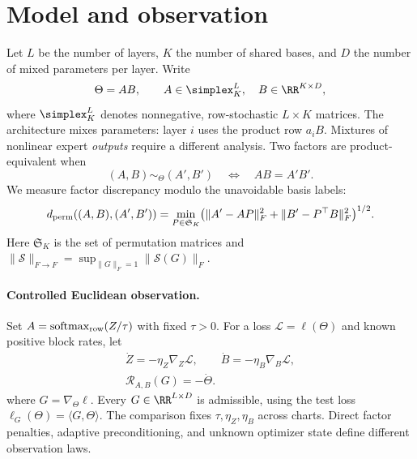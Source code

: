 \section{Model and observation}
\label{sec:problem}

Let $L$ be the number of layers, $K$ the number of shared bases, and $D$
the number of mixed parameters per layer. Write
\begin{equation}
 \Theta=AB,\qquad A\in\simplex_K^L,\quad B\in\RR^{K\times D},
 \label{eq:factorization}
\end{equation}
where $\simplex_K^L$ denotes nonnegative, row-stochastic $L\times K$
matrices. The architecture mixes parameters: layer $i$ uses the product row $a_iB$.
Mixtures of nonlinear expert \emph{outputs} require a different analysis. Two factors are product-equivalent when
\begin{equation}
 (A,B)\sim_\Theta(A',B')\quad\Longleftrightarrow\quad AB=A'B'.
 \label{eq:effective_equivalence}
\end{equation}
We measure factor discrepancy modulo the unavoidable basis labels:
\begin{equation}
 d_{\rm perm}((A,B),(A',B'))=
 \min_{P\in\mathfrak S_K}
 \bigl(\|A'-AP\|_F^2+\|B'-P^\top B\|_F^2\bigr)^{1/2}.
 \label{eq:permutation-distance}
\end{equation}
Here $\mathfrak S_K$ is the set of permutation matrices and
$\|\mathcal S\|_{F\to F}=\sup_{\|G\|_F=1}\|\mathcal S(G)\|_F$.

\paragraph{Controlled Euclidean observation.}
Set $A=\operatorname{softmax}_{\rm row}(Z/\tau)$ with fixed $\tau>0$.
For a loss $\mathcal L=\ell(\Theta)$ and known positive block rates, let
\begin{align}
 \dot Z=-\eta_Z\nabla_Z\mathcal L,\qquad
 \dot B=-\eta_B\nabla_B\mathcal L,
 \label{eq:response_flow}\\
 \mathcal R_{A,B}(G)=-\dot\Theta.
 \label{eq:response_operator}
\end{align}
where $G=\nabla_\Theta\ell$. Every $G\in\RR^{L\times D}$ is admissible,
using the test loss $\ell_G(\Theta)=\langle G,\Theta\rangle$.
The comparison fixes $\tau,\eta_Z,\eta_B$ across charts. Direct factor
penalties, adaptive preconditioning, and unknown optimizer state define
different observation laws.

